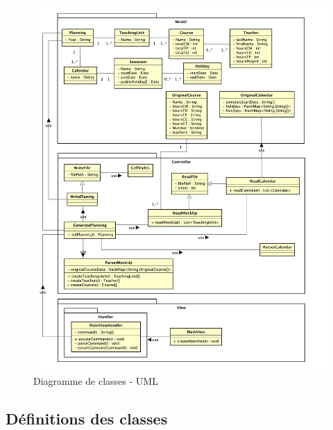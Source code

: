 \documentclass{polytech/polytech}
\begin{document}
	\begin{figure}
		\caption{Diagramme de classes - UML}
		\includegraphics[width=\textwidth]{./img/Diagram.png}
	\end{figure}

	\pagebreak

	\subsection{Définitions des classes}
\end{document}
